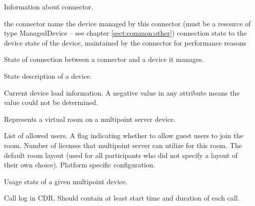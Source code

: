 \begin{Api}

Information about connector.
\begin{ApiClassAttributes}
 the connector name
 the device managed by this connector (must be a resource of type ManagedDevice -- see chapter \ref{sect:common:other})
 connection state to the device
 state of the device, maintained by the connector for performance reasons
\end{ApiClassAttributes}

State of connection between a connector and a device it manages.
\begin{ApiEnumValues}
\end{ApiEnumValues}

State description of a device.
\todo{}

Current device load information. A negative value in any attribute means the value could not be determined.
\begin{ApiClassAttributes}
\end{ApiClassAttributes}

Represents a virtual room on a multipoint server device.
\begin{ApiClassAttributes}
 List of allowed users.
 A flag indicating whether to allow guest users to join the room.
 Number of licenses that multipoint server can utilize for this room.
 The default room layout (used for all participants who did not specify a layout of their own choice).
 Platform specific configuration.
\end{ApiClassAttributes}

Usage stats of a given multipoint device.
\begin{ApiClassAttributes}
 Call log in CDR. Should contain at least start time and duration of each call.
\end{ApiClassAttributes}


\end{Api}
